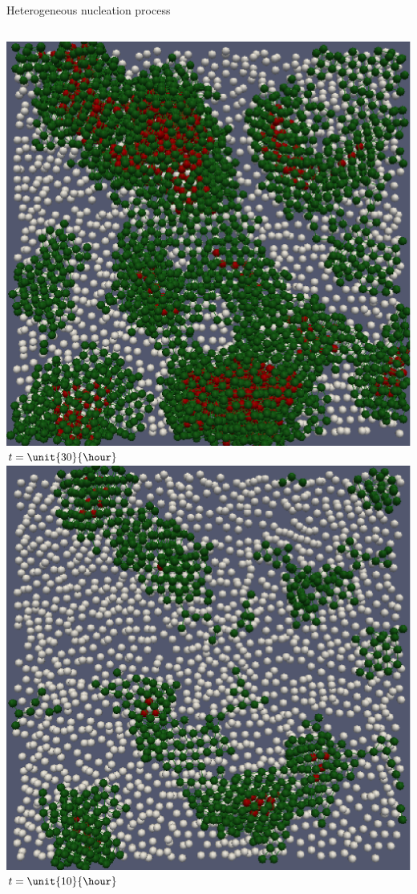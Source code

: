 \begin{frame}{Heterogeneous nucleation process}
\begin{columns}
	\bigskip\includegraphics[width=\columnwidth]{X_t150}\\
	$t=\unit{30}{\hour}$
	\includegraphics[width=\columnwidth]{X_t050}\\
	$t=\unit{10}{\hour}$
	

\end{columns}
\end{frame}
